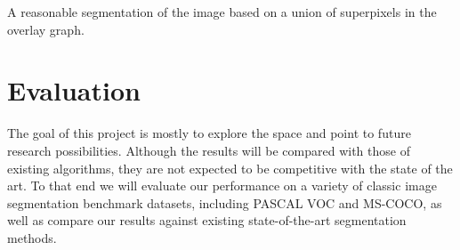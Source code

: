 \documentclass[twocolumn]{article}
\begin{document}
A reasonable segmentation of the image based on a union of superpixels in the overlay graph.

\section{Evaluation}

The goal of this project is mostly to explore the space and point to future research possibilities. Although the results will
be compared with those of existing algorithms, they are not expected to be competitive with the state of the art. To that end
we will evaluate our performance on a variety of classic image segmentation benchmark datasets, including PASCAL VOC and
MS-COCO, as well as compare our results against existing state-of-the-art segmentation methods. 
\end{document}
